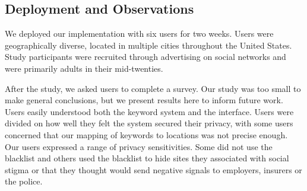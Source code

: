 
\subsection{Deployment and Observations}
We deployed our implementation with six users for two weeks. 
Users were geographically diverse, located in multiple cities throughout the United States.
Study participants were recruited through advertising on social networks and were primarily adults in their mid-twenties.

After the study, we asked users to complete a survey. Our study was too small to make general conclusions, 
but we present results here to inform future work. 
Users easily understood both the keyword system and the interface. 
Users were divided on how well they felt the system secured their privacy, with some 
users concerned that our mapping of keywords to locations was not precise enough. Our users expressed a range of 
privacy sensitivities. Some did not use the blacklist and others used the blacklist to hide sites they associated with social stigma or that they thought would send negative signals to employers, insurers or the police.


